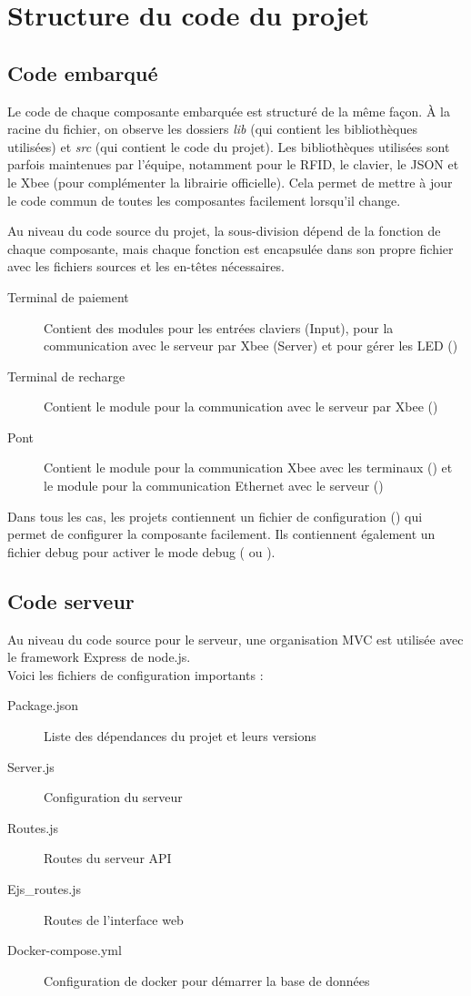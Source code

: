 \section{Structure du code du projet}
	\subsection{Code embarqué}
	Le code de chaque composante embarquée est structuré de la même façon. À la racine du fichier, on observe les dossiers \emph{lib} (qui contient les bibliothèques utilisées) et \emph{src} (qui contient le code du projet). Les bibliothèques utilisées sont parfois maintenues par l’équipe, notamment pour le RFID, le clavier, le JSON et le Xbee (pour complémenter la librairie officielle). Cela permet de mettre à jour le code commun de toutes les composantes facilement lorsqu’il change. 

	Au niveau du code source du projet, la sous-division dépend de la fonction de chaque composante, mais chaque fonction est encapsulée dans son propre fichier avec les fichiers sources et les en-têtes nécessaires. 
	\begin{description}
		\item[Terminal de paiement] Contient des modules pour les entrées claviers (Input), pour la communication avec le serveur par Xbee (Server) et pour gérer les LED ()
		\item[Terminal de recharge] Contient le module pour la communication avec le serveur par Xbee ()
		\item[Pont] Contient le module pour la communication Xbee avec les terminaux () et le module pour la communication Ethernet avec le serveur ()
	\end{description}
	
	Dans tous les cas, les projets contiennent un fichier de configuration () qui permet de configurer la composante facilement. Ils contiennent également un fichier debug pour activer le mode debug ( ou ).

	
	\subsection{Code serveur}
	Au niveau du code source pour le serveur, une organisation MVC est utilisée avec le framework Express de node.js. \\

	\noindent Voici les fichiers de configuration importants :
 	\begin{description}
 		\item[Package.json] Liste des dépendances du projet et leurs versions 
 		\item[Server.js] Configuration du serveur
 		\item[Routes.js] Routes du serveur API
 		\item[Ejs\_routes.js] Routes de l’interface web
 		\item[Docker-compose.yml] Configuration de docker pour démarrer la base de données
 	\end{description}

